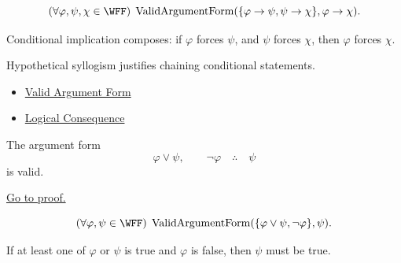 \begin{remark*}
\[
(\forall\varphi,\psi,\chi\in\WFF)\;\operatorname{ValidArgumentForm}(\{\varphi\to\psi,\psi\to\chi\},\varphi\to\chi).
\]
\end{remark*}

\begin{remark*}
Conditional implication composes: if \(\varphi\) forces \(\psi\), and \(\psi\) forces \(\chi\), then \(\varphi\) forces \(\chi\).
\end{remark*}

\begin{remark*}[Interpretation]
Hypothetical syllogism justifies chaining conditional statements.
\end{remark*}

\begin{dependencies}
\begin{itemize}
  \item \hyperref[def:valid-argument-form-propositional-logic]{Valid Argument Form}
  \item \hyperref[def:logical-consequence-propositional-logic]{Logical Consequence}
\end{itemize}
\end{dependencies}

\begin{tcolorbox}[colback=thmbox, colframe=thmborder, arc=2pt,
  left=6pt, right=6pt, top=4pt, bottom=4pt,
  title={\small\textbf{Theorem (Disjunctive Syllogism is Valid)}},
  fonttitle=\small\bfseries]
\begin{theorem}
\label{thm:disjunctive-syllogism-validity-propositional-logic}
The argument form
\[
\varphi\lor\psi,\qquad \neg\varphi \quad\therefore\quad \psi
\]
is valid.

\noindent\hyperref[prf:disjunctive-syllogism-validity-propositional-logic]{Go to proof.}
\end{theorem}
\end{tcolorbox}

\begin{remark*}
\[
(\forall\varphi,\psi\in\WFF)\;\operatorname{ValidArgumentForm}(\{\varphi\lor\psi,\neg\varphi\},\psi).
\]
\end{remark*}

\begin{remark*}
If at least one of \(\varphi\) or \(\psi\) is true and \(\varphi\) is false, then \(\psi\) must be true.
\end{remark*}


